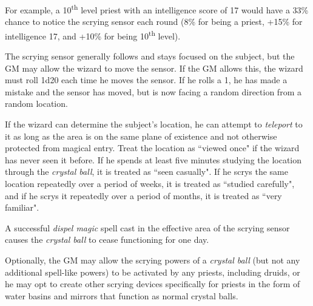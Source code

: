 \begin{multicols}{2}
For example, a 10\textsuperscript{th} level priest with an intelligence score of 17 would have a 33\% chance to notice the scrying sensor each round (8\% for being a priest, +15\% for intelligence 17, and +10\% for being 10\textsuperscript{th} level).  

The scrying sensor generally follows and stays focused on the subject, but the GM may allow the wizard to move the sensor.  If the GM allows this, the wizard must roll 1d20 each time he moves the sensor.  If he rolls a 1, he has made a mistake and the sensor has moved, but is now facing a random direction from a random location.

If the wizard can determine the subject's location, he can attempt to \textit{teleport} to it as long as the area is on the same plane of existence and not otherwise protected from magical entry.  Treat the location as ``viewed once" if the wizard has never seen it before.  If he spends at least five minutes studying the location through the \textit{crystal ball}, it is treated as ``seen casually".  If he scrys the same location repeatedly over a period of weeks, it is treated as ``studied carefully", and if he scrys it repeatedly over a period of months, it is treated as ``very familiar".

A successful \textit{dispel magic} spell cast in the effective area of the scrying sensor causes the \textit{crystal ball} to cease functioning for one day.  

Optionally, the GM may allow the scrying powers of a \textit{crystal ball} (but not any additional spell-like powers) to be activated by any priests, including druids, or he may opt to create other scrying devices specifically for priests in the form of water basins and mirrors that function as normal crystal balls.


\end{multicols}
